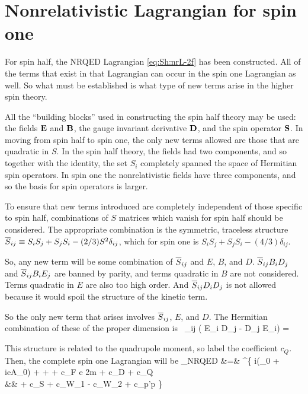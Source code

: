 \section{Nonrelativistic Lagrangian for spin one}

For spin half, the NRQED Lagrangian \eqref{eq:Sh:nrL-2f} has been constructed.  All of the terms that exist in that Lagrangian can occur in the spin one Lagrangian as well.  So what must be established is what type of new terms arise in the higher spin theory.

All the ``building blocks'' used in constructing the spin half theory may be used: the fields $\mathbf{E}$ and $\mathbf{B}$, the gauge invariant derivative $\mathbf{D}$, and the spin operator $\mathbf{S}$.  In moving from spin half to spin one, the only new terms allowed are those that are quadratic in $S$.  In the spin half theory, the fields had two components, and so together with the identity, the set $S_i$ completely spanned the space of Hermitian spin operators.  In spin one the nonrelativistic fields have three components, and so the basis for spin operators is larger.

To ensure that new terms introduced are completely independent of those specific to spin half, combinations of $S$ matrices which vanish for spin half should be considered.  The appropriate combination is the symmetric, traceless structure $\overline{S}_{ij} \equiv S_i S_j + S_j S_i - (2/3) S^2 \delta_{ij}$, which for spin one is $S_i S_j + S_j S_i - (4/3) \delta_{ij}$.

So, any new term will be some combination of $\overline{S}_{ij}$ and $E$, $B$, and $D$.  $\overline{S}_{ij} B_i D_j$ and $\overline{S}_{ij} B_i E_j$ are banned by parity, and terms quadratic in $B$ are not considered.  Terms quadratic in $E$ are also too high order.  And $\overline{S}_{ij} D_i D_j$ is not allowed because it would spoil the structure of the kinetic term.

So the only new term that arises involves $\overline{S}_{ij}$, $E$, and $D$.  The Hermitian combination of these of the proper dimension is
\beq	
	 \ \Sb_{ij} ( E_i D_j - D_j E_i) =  
\eeq

This structure is related to the quadrupole moment, so label the coefficient $c_Q$.  Then, the complete spin one Lagrangian will be
\scriptsize \label{eq:S1:Lnr}
\beqa
	_{NRQED} &=& \Psi^\dagger \{ i(\partial_0 + ieA_0) +  +  
		+ c_F e  {2m}   	
		+ c_D 	
		+ c_Q 	
	\\&&	+ c_S 
		+ c_{W_1} 	
		- c_{W_2} 
		+ c_{p'p} \frac{ e [ (\v{S} \smalldot \v{D}) (\v{B} \smalldot \v{D}) + (\v{B} \smalldot \v{D})(\v{S} \smalldot \v{D}) }{8m^3} \} \Psi
\eeqa
\normalsize



